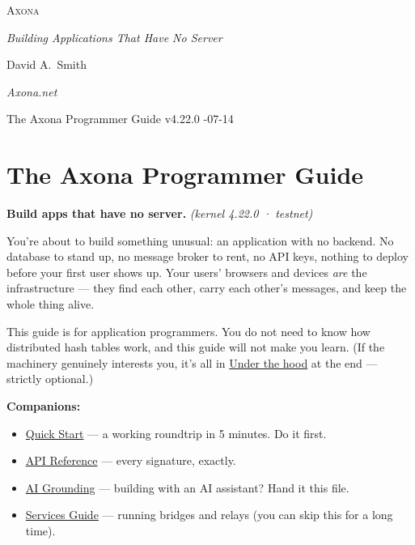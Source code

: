 \documentclass[
  nobib]{tufte-handout}
\author{}
\date{}
\providecommand{\tightlist}{%
  \setlength{\itemsep}{0pt}\setlength{\parskip}{0pt}}
\begin{document}
\thispagestyle{empty}
\null\vfill
\begin{center}
{\fontsize{48}{52}\selectfont \textsc{Axona}\par}
\vspace{0.6em}
{\Large\itshape Building Applications That Have No Server\par}
\vspace{4em}
{\large David A.~Smith\par}
{\itshape\small Axona.net\par}
\vspace{2em}
{\small The Axona Programmer Guide \quad v4.22.0 -07-14\par}
\end{center}
\vfill
\null
\newpage
\pagestyle{ndhtplain}
\thispagestyle{ndhtplain}
\setcounter{page}{1}

\section{The Axona Programmer Guide}\label{the-axona-programmer-guide}

\textbf{Build apps that have no server.} \emph{(kernel 4.22.0 ·
testnet)}

You're about to build something unusual: an application with no backend.
No database to stand up, no message broker to rent, no API keys, nothing
to deploy before your first user shows up. Your users' browsers and
devices \emph{are} the infrastructure --- they find each other, carry
each other's messages, and keep the whole thing alive.

This guide is for application programmers. You do not need to know how
distributed hash tables work, and this guide will not make you learn.
(If the machinery genuinely interests you, it's all in
\hyperref[9-under-the-hood--optional]{Under the hood} at the end ---
strictly optional.)

\textbf{Companions:}

\begin{itemize}
\tightlist
\item
  \href{Quick-Start-v4.22.0.md}{Quick Start} --- a working roundtrip in
  5 minutes. Do it first.
\item
  \href{Axona-API-Reference-v4.22.0.md}{API Reference} --- every
  signature, exactly.
\item
  \href{Axona-AI-Grounding-v4.22.0.md}{AI Grounding} --- building with
  an AI assistant? Hand it this file.
\item
  \href{Axona-Services-Guide-v4.22.0.md}{Services Guide} --- running
  bridges and relays (you can skip this for a long time).
\end{itemize}
\end{document}
